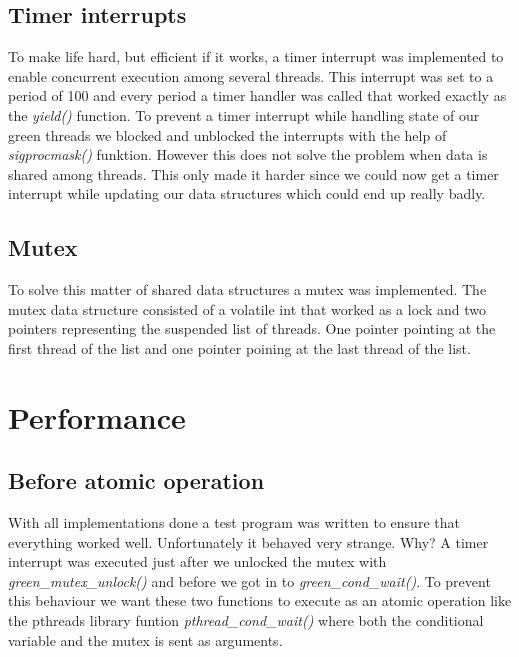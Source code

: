 \documentclass[12pt, letterpaper]{article}
\begin{document}
\subsection{Timer interrupts}
To make life hard, but efficient if it works, a timer interrupt was implemented to enable concurrent execution
among several threads. This interrupt was set to a period of 100 and every period a timer handler was called
that worked exactly as the \emph{yield()} function. To prevent a timer interrupt while handling state of our green threads
we blocked and unblocked the interrupts with the help of \emph{sigprocmask()} funktion.
However this does not solve the problem when data is shared among threads. This only made it harder since
we could now get a timer interrupt while updating our data structures which could end up really badly. 

\subsection{Mutex}
To solve this matter of shared data structures a mutex was implemented. The mutex data structure consisted of
a volatile int that worked as a lock and two pointers representing the suspended list of threads. One pointer
pointing at the first thread of the list and one pointer poining at the last thread of the list. 

\section{Performance}

\subsection{Before atomic operation}
With all implementations done a test program was written to ensure that everything worked well.
Unfortunately it behaved very strange. Why? A timer interrupt was executed just after we unlocked the mutex with \emph{green{\_}mutex{\_}unlock()}
and before we got in to \emph{green{\_}cond{\_}wait()}. To prevent this behaviour we want these two functions to execute as an 
atomic operation like the pthreads library funtion \emph{pthread{\_}cond{\_}wait()} where both the conditional variable
and the mutex is sent as arguments. 
\end{document}
